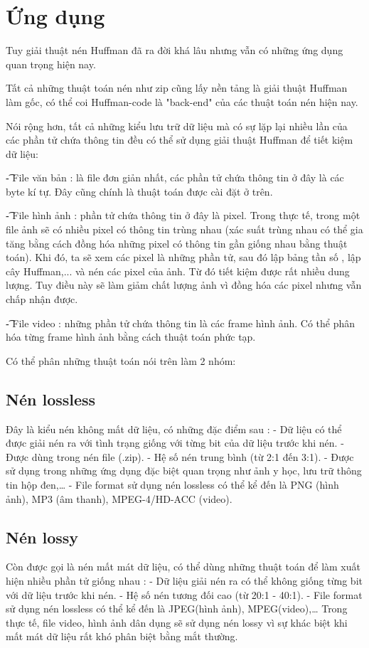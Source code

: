 \documentclass[14pt]{extreport}
\begin{document}
\section{Ứng dụng}
Tuy giải thuật nén Huffman đã ra đời khá lâu nhưng vẫn có những ứng dụng quan trọng hiện nay.

Tất cả những thuật toán nén như zip cũng lấy nền tảng là giải thuật Huffman làm gốc, có thể coi Huffman-code là "back-end" của các thuật toán nén hiện nay.

Nói rộng hơn, tất cả những kiểu lưu trữ dữ liệu mà có sự lặp lại nhiều lần của các phần tử chứa thông tin đều có thể sử dụng giải thuật Huffman để tiết kiệm dữ liệu:

\t - File văn bản : là file đơn giản nhất, các phần tử chứa thông tin ở đây là các byte kí tự. Đây cũng chính là thuật toán được cài đặt ở trên.

\t - File hình ảnh : phần tử chứa thông tin ở đây là pixel. Trong thực tế, trong một file ảnh sẽ có nhiều
 pixel có thông tin trùng nhau (xác suất trùng nhau có thể gia tăng bằng cách đồng hóa những pixel có
  thông tin gần giống nhau bằng thuật toán). Khi đó, ta sẽ xem các pixel là những phần tử, sau đó lập bảng tần số 
  , lập cây Huffman,... và nén các pixel của ảnh. Từ đó tiết kiệm được rất nhiều dung lượng. Tuy điều này sẽ làm 
  giảm chất lượng ảnh vì đồng hóa các pixel nhưng vẫn chấp nhận được.

  \t - File video : những phần tử chứa thông tin là các frame hình ảnh. Có thể phân hóa từng frame hình ảnh bằng cách thuật toán phức tạp.

  Có thể phân những thuật toán nói trên làm 2 nhóm:\cite{4}
  \subsection{Nén lossless}
  Đây là kiểu nén không mất dữ liệu, có những đặc điểm sau :
  - Dữ liệu có thể được giải nén ra với tình trạng giống với từng bit của dữ liệu trước khi nén.
  - Được dùng trong nén file (.zip).
  - Hệ số nén trung bình (từ 2:1 đến 3:1). 
  - Được sử dụng trong những ứng dụng đặc biệt quan trọng như ảnh y học, lưu trữ thông tin hộp đen,\dots
  - File format sử dụng nén lossless có thể kể đến là PNG (hình ảnh), MP3 (âm thanh), MPEG-4/HD-ACC (video).
  \subsection{Nén lossy}
  Còn được gọi là nén mất mát dữ liệu, có thể dùng những thuật toán để làm xuất hiện nhiều phần tử giống nhau :
  - Dữ liệu giải nén ra có thể không giống từng bit với dữ liệu trước khi nén.
  - Hệ số nén tương đối cao (từ 20:1 - 40:1).
  - File format sử dụng nén lossless có thể kể đến là JPEG(hình ảnh), MPEG(video),\dots
  Trong thực tế, file video, hình ảnh dân dụng sẽ sử dụng nén lossy vì sự khác biệt khi mất mát dữ liệu rất khó phân 
  biệt bằng mắt thường.
\end{document}
